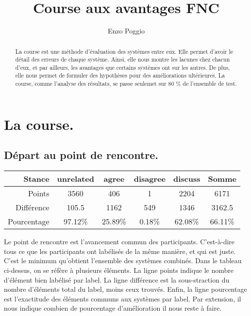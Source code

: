 \documentclass[onecolumn, 12pt]{article}
\title{Course aux avantages FNC}
\author{Enzo Poggio}
\begin{document}
\maketitle{}


\begin{abstract}
 La course est une méthode d'évaluation des systèmes entre eux.
 Elle permet d'avoir le détail des erreurs de chaque système.
 Ainsi, elle nous montre les lacunes chez chacun d'eux,
 et par ailleurs, les avantages que certains systèmes ont sur les autres.
 De plus, elle nous permet de formuler des hypothèses pour des améliorations ultérieures.
 La course, comme l'analyse des résultats, se passe seulemet sur 80 \% de l'ensemble de test.\end{abstract}
 
 \section{La course.}
 \subsection{Départ au point de rencontre.}
 
 \begin{center}
  
  \begin{tabular}{ r | c c c c | c}
   Stance      & unrelated & agree   & disagree & discuss & Somme   \\ \hline
   Points      & 3560      & 406     & 1        & 2204    & 6171    \\
   Différence & 105.5     & 1162    & 549      & 1346    & 3162.5  \\
   Pourcentage & 97.12\%   & 25.89\% & 0.18\%   & 62.08\% & 66.11\% \\
  \end{tabular}
 \end{center}
 
 Le  point de rencontre est l'avancement commun des participants.
 C'est-à-dire tous ce que les participants ont labélisés de la même manière, et qui est juste.
 C'est le minimum qu'obtient l'ensemble des systèmes combinés.
 Dans le tableau ci-dessus, on se réfère à plusieurs éléments.
 La ligne \og points \fg indique le nombre d'élément bien labélisé par label.
 La ligne \og différence \fg est la sous-straction du nombre d'éléments total du label, moins ceux trouvés.
 Enfin, la ligne \og pourcentage \fg est l'exactitude des éléments communs aux systèmes par label.
 Par extension, il nous indique  combien de pourcentage d'amélioration il nous reste à faire.
 
\end{document}
